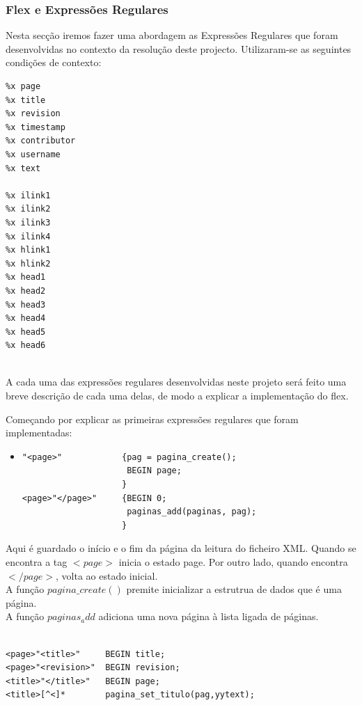 \documentclass[11pt, a4paper, oneside]{article}
\begin{document}
\subsubsection{Flex e Expressões Regulares}

Nesta secção iremos fazer uma abordagem as Expressões Regulares que foram desenvolvidas no contexto da resolução deste projecto. Utilizaram-se as seguintes condições de contexto:

\begin{verbatim}
%x page
%x title
%x revision
%x timestamp
%x contributor
%x username
%x text

%x ilink1
%x ilink2
%x ilink3
%x ilink4
%x hlink1
%x hlink2
%x head1
%x head2
%x head3
%x head4
%x head5
%x head6


\end{verbatim}

A cada uma das expressões regulares desenvolvidas neste projeto será feito uma breve descrição de cada uma delas, de modo a explicar a implementação do flex.

Começando por explicar as primeiras expressões regulares que foram implementadas: 

\begin{itemize}
\item 
\begin{verbatim}
"<page>"            {pag = pagina_create();
                     BEGIN page;
                    }
<page>"</page>"     {BEGIN 0;
                     paginas_add(paginas, pag);
                    }
\end{verbatim}
\end{itemize}
Aqui é guardado o início e o fim da página da leitura do ficheiro XML. Quando se encontra a tag \begin{math}<page>\end{math} inicia o estado page. Por outro lado, quando encontra \begin{math}</page>\end{math}, volta ao estado inicial. 
\\A função \begin{math}pagina\_create()\end{math} premite inicializar a estrutrua de dados que é uma página.
\\ A função \begin{math}paginas_add\end{math} adiciona uma nova página à lista ligada de páginas.

\begin{verbatim}

<page>"<title>"     BEGIN title;
<page>"<revision>"  BEGIN revision;
<title>"</title>"   BEGIN page;
<title>[^<]*        pagina_set_titulo(pag,yytext);

\end{verbatim}
\end{document}
